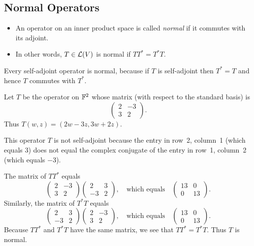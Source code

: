 \subsection{Normal Operators}

\begin{definition}[Normal]\label{ax:7.18}\leavevmode
\begin{itemize}
\item An operator on an inner product space is called \emph{normal} if it
  commutes with its adjoint.
\item In other words, $T\in\mathcal{L}(V)$ is normal if $TT^*=T^*T$.
\end{itemize}
\end{definition}

Every self-adjoint operator is normal, because if $T$ is self-adjoint then
$T^*=T$ and hence $T$ commutes with $T^*$.

\begin{example}\label{ax:7.19}
Let $T$ be the operator on $\mathbb{F}^2$ whose matrix (with respect to the standard
basis) is
\[ \begin{pmatrix} 2 & -3\\ 3 & 2 \end{pmatrix}. \]
Thus $T(w,z)=(2w-3z,3w+2z)$.

This operator $T$ is not self-adjoint because the entry in row~2, column~1
(which equals $3$) does not equal the complex conjugate of the entry in row~1,
column~2 (which equals $-3$).

The matrix of $TT^*$ equals
\[ \begin{pmatrix} 2 & -3\\ 3 & 2 \end{pmatrix}
   \begin{pmatrix} 2 & 3\\ -3 & 2 \end{pmatrix},
   \quad\text{which equals}\quad
   \begin{pmatrix} 13 & 0\\ 0 & 13 \end{pmatrix}. \]
Similarly, the matrix of $T^*T$ equals
\[ \begin{pmatrix} 2 & 3\\ -3 & 2 \end{pmatrix}
   \begin{pmatrix} 2 & -3\\ 3 & 2 \end{pmatrix},
   \quad\text{which equals}\quad
   \begin{pmatrix} 13 & 0\\ 0 & 13 \end{pmatrix}. \]
Because $TT^*$ and $T^*T$ have the same matrix, we see that $TT^*=T^*T$. Thus
$T$ is normal.
\end{example}

